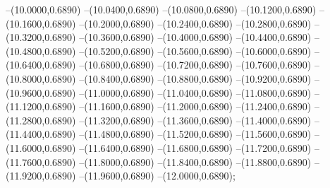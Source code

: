 {	--(10.0000,0.6890)
	--(10.0400,0.6890)
	--(10.0800,0.6890)
	--(10.1200,0.6890)
	--(10.1600,0.6890)
	--(10.2000,0.6890)
	--(10.2400,0.6890)
	--(10.2800,0.6890)
	--(10.3200,0.6890)
	--(10.3600,0.6890)
	--(10.4000,0.6890)
	--(10.4400,0.6890)
	--(10.4800,0.6890)
	--(10.5200,0.6890)
	--(10.5600,0.6890)
	--(10.6000,0.6890)
	--(10.6400,0.6890)
	--(10.6800,0.6890)
	--(10.7200,0.6890)
	--(10.7600,0.6890)
	--(10.8000,0.6890)
	--(10.8400,0.6890)
	--(10.8800,0.6890)
	--(10.9200,0.6890)
	--(10.9600,0.6890)
	--(11.0000,0.6890)
	--(11.0400,0.6890)
	--(11.0800,0.6890)
	--(11.1200,0.6890)
	--(11.1600,0.6890)
	--(11.2000,0.6890)
	--(11.2400,0.6890)
	--(11.2800,0.6890)
	--(11.3200,0.6890)
	--(11.3600,0.6890)
	--(11.4000,0.6890)
	--(11.4400,0.6890)
	--(11.4800,0.6890)
	--(11.5200,0.6890)
	--(11.5600,0.6890)
	--(11.6000,0.6890)
	--(11.6400,0.6890)
	--(11.6800,0.6890)
	--(11.7200,0.6890)
	--(11.7600,0.6890)
	--(11.8000,0.6890)
	--(11.8400,0.6890)
	--(11.8800,0.6890)
	--(11.9200,0.6890)
	--(11.9600,0.6890)
	--(12.0000,0.6890);
}
